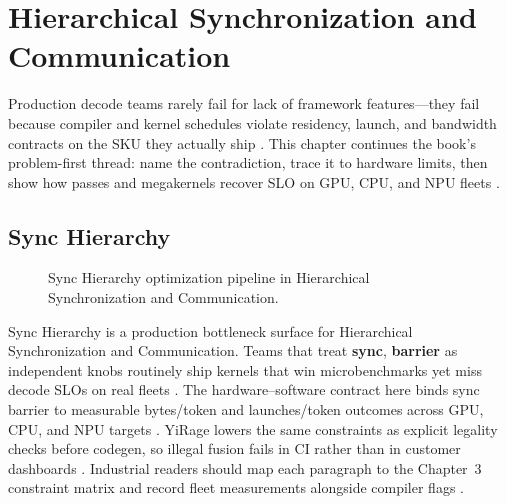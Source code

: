 \chapter{Hierarchical Synchronization and Communication}
\label{chap:ch09}

Production decode teams rarely fail for lack of framework features---they fail because compiler and kernel schedules violate residency, launch, and bandwidth contracts on the SKU they actually ship \citep{patel2025llminference,nvidia2022hopper}. This chapter continues the book's problem-first thread: name the contradiction, trace it to hardware limits, then show how passes and megakernels recover SLO on GPU, CPU, and NPU fleets \citep{taxbreak2026,semianalysis2024tma}.

\section{Sync Hierarchy}
\label{sec:sync_hierarchy}
\begin{figure}[t]
\centering
{}
\caption{Sync Hierarchy optimization pipeline in Hierarchical Synchronization and Communication.}
\label{fig:sync_hierarchy_pipeline}
\end{figure}


Sync Hierarchy is a production bottleneck surface for Hierarchical Synchronization and Communication. Teams that treat \textbf{sync}, \textbf{barrier} as independent knobs routinely ship kernels that win microbenchmarks yet miss decode SLOs on real fleets \citep{patel2025llminference,nvidia2022hopper}. The hardware--software contract here binds sync barrier to measurable bytes/token and launches/token outcomes across GPU, CPU, and NPU targets \citep{taxbreak2026,semianalysis2024tma}. YiRage lowers the same constraints as explicit legality checks before codegen, so illegal fusion fails in CI rather than in customer dashboards \citep{memoryfloor2026,amd2024xdna}. Industrial readers should map each paragraph to the Chapter~3 constraint matrix and record fleet measurements alongside compiler flags \citep{nvidia2022hopper,amd2024aie}.

